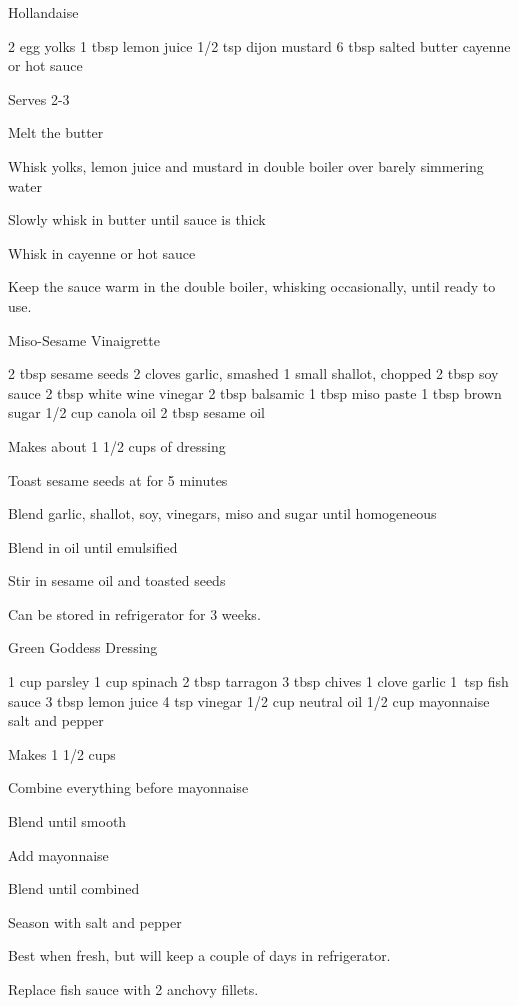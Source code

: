 \begin{recipe}{Hollandaise}{\vegetarian{}}
\begin{ingredients}
2 egg yolks
1 tbsp lemon juice
1/2 tsp dijon mustard
6 tbsp salted butter
cayenne or hot sauce
\end{ingredients}
\nextcolumn
Serves 2-3
\begin{steps}
    \item Melt the butter
    \item Whisk yolks, lemon juice and mustard in double boiler over barely simmering water
    \item Slowly whisk in butter until sauce is thick
    \item Whisk in cayenne or hot sauce
\end{steps}
Keep the sauce warm in the double boiler, whisking occasionally, until ready to use.
\end{recipe}

\begin{recipe}{Miso-Sesame Vinaigrette}{\vegetarian{}}
\begin{ingredients}
2 tbsp sesame seeds
2 cloves garlic, smashed
1 small shallot, chopped
2 tbsp soy sauce
2 tbsp white wine \ibreak vinegar
2 tbsp balsamic
1 tbsp miso paste
1 tbsp brown sugar
1/2 cup canola oil
2 tbsp sesame oil
\end{ingredients}
\nextcolumn
Makes about 1 1/2 cups of dressing
\begin{steps}
    \item Toast sesame seeds at  for 5 minutes
    \item Blend garlic, shallot, soy, vinegars, miso and sugar until homogeneous
    \item Blend in oil until emulsified
    \item Stir in sesame oil and toasted seeds
\end{steps}
Can be stored in refrigerator for 3 weeks.
\end{recipe}

\begin{recipe}{Green Goddess Dressing}{}
\begin{ingredients}
1 cup parsley
1 cup spinach
2 tbsp tarragon
3 tbsp chives
1 clove garlic
1~tsp fish sauce
3 tbsp lemon juice
4 tsp vinegar
1/2 cup neutral oil
1/2 cup mayonnaise
salt and pepper
\end{ingredients}
\nextcolumn
Makes 1 1/2 cups
\begin{steps}
    \item Combine everything before mayonnaise
    \item Blend until smooth
    \item Add mayonnaise
    \item Blend until combined
    \item Season with salt and pepper
\end{steps}
Best when fresh, but will keep a couple of days in refrigerator.

Replace fish sauce with 2 anchovy fillets.
\end{recipe}

